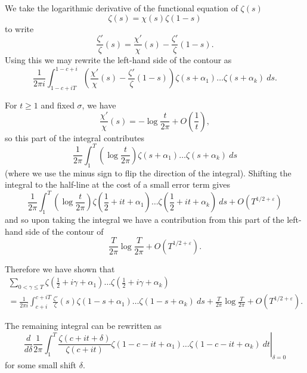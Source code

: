 \documentclass[12pt,a4paper,reqno]{amsart}
\theoremstyle{remark}
\numberwithin{equation}{section}
\begin{document}
We take the logarithmic derivative of the functional equation of $\zeta (s)$ 
\begin{equation*}
    \zeta (s) = \chi (s) \zeta (1-s)
\end{equation*}
to write
\[
\frac{\zeta '}{\zeta} (s) = \frac{\chi '}{\chi} (s) - \frac{\zeta '}{\zeta} (1-s).
\]
Using this we may rewrite the left-hand side of the contour as
\[
\frac{1}{2 \pi i} \int_{1-c+iT}^{1-c+i} \left( \frac{\chi '}{\chi} (s) - \frac{\zeta '}{\zeta} (1-s) \right) \zeta \left( s + \alpha_1 \right)\dots\zeta \left( s + \alpha_k \right) \ ds.
\]

For $t \geq 1$ and fixed $\sigma$, we have
\[
\frac{\chi '}{\chi}(s) = -\log \frac{t}{2\pi} + O\left( \frac{1}{t}\right),
\]
so this part of the integral contributes
\[
\frac{1}{2 \pi} \int_{1}^{T} \left( \log \frac{t}{2\pi} \right) \zeta \left( s + \alpha_1 \right)\dots\zeta \left( s + \alpha_k \right) \ ds
\]
(where we use the minus sign to flip the direction of the integral). Shifting the integral to the half-line at the cost of a small error term gives
\[
\frac{1}{2 \pi} \int_{1}^{T} \left( \log \frac{t}{2\pi} \right) \zeta \left( \frac{1}{2} + it + \alpha_1 \right)\dots\zeta \left( \frac{1}{2} + it + \alpha_k \right) \ ds + O\left( T^{1/2+\varepsilon} \right)
\]
and so upon taking the integral we have a contribution from this part of the left-hand side of the contour of
\[
\frac{T}{2\pi} \log \frac{T}{2\pi} + O\left( T^{1/2+\varepsilon} \right).
\]

Therefore we have shown that
\begin{multline}\label{eq:prodshiftedzeta}
\sum_{0 < \gamma \leq T}  \zeta \left( \frac{1}{2} + i \gamma + \alpha_1 \right)\dots\zeta \left( \frac{1}{2} + i \gamma + \alpha_k \right) \\
=  \frac{1}{2 \pi i} \int_{c+i}^{c+i T}\frac{\zeta '}{\zeta} (s) \zeta (1-s + \alpha_1) \dots \zeta (1-s + \alpha_k) \ ds + \frac{T}{2\pi} \log \frac{T}{2\pi} + O\left(T^{1/2+\varepsilon}\right).
\end{multline}

The remaining integral can be rewritten as
\begin{equation*}
\left. \frac{d}{d \delta} \frac{1}{2 \pi} \int_{1}^{T} \frac{\zeta (c+it + \delta)}{\zeta (c+it)}  \zeta (1-c-it + \alpha_1) \dots \zeta (1-c-it + \alpha_k) \ dt \right|_{\delta=0}
\end{equation*}
for some small shift $\delta$.
\end{document}
